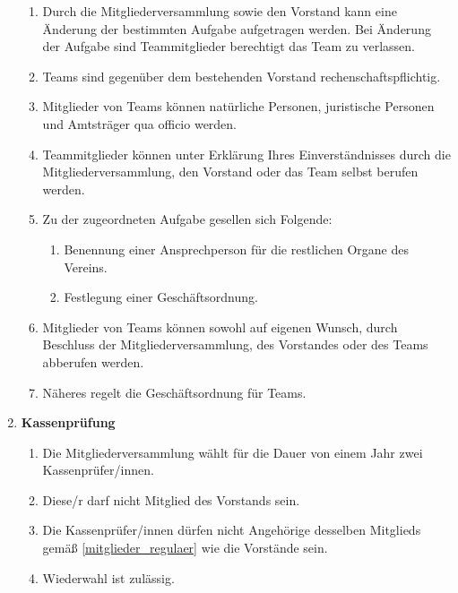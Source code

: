 \documentclass[german]{article}
\newcommand{\paragr}[1]{\item \textsf{\textbf{#1}}}
\begin{document}
\begin{enumerate}
\begin{enumerate}
			\item Durch die Mitgliederversammlung sowie den Vorstand kann eine Änderung der bestimmten Aufgabe aufgetragen werden. Bei Änderung der Aufgabe sind Teammitglieder berechtigt das Team zu verlassen.
			
			\item Teams sind gegenüber dem bestehenden Vorstand rechenschaftspflichtig.
			
			\item Mitglieder von Teams können natürliche Personen, juristische Personen und Amtsträger qua officio werden.
			
			\item Teammitglieder können unter Erklärung Ihres Einverständnisses durch die Mitgliederversammlung, den Vorstand oder das Team selbst berufen werden.
			
			\item Zu der zugeordneten Aufgabe gesellen sich Folgende:
			\begin{enumerate}
				\item Benennung einer Ansprechperson für die restlichen Organe des Vereins.
				\item Festlegung einer Geschäftsordnung.
			\end{enumerate}
			
			\item Mitglieder von Teams können sowohl auf eigenen Wunsch, durch Beschluss der Mitgliederversammlung, des Vorstandes oder des Teams abberufen werden.
			
			\item Näheres regelt die Geschäftsordnung für Teams.
			
		\end{enumerate}
		
		
		\paragr{Kassenprüfung}
		\begin{enumerate}
			
			\item Die Mitgliederversammlung wählt für die Dauer von einem Jahr zwei Kassenprüfer/innen.
			
			\item Diese/r darf nicht Mitglied des Vorstands sein.
			
			\item Die Kassenprüfer/innen dürfen nicht Angehörige desselben Mitglieds gemäß \ref{mitglieder_regulaer} wie die Vorstände sein.
			
			\item Wiederwahl ist zulässig.
			

\end{enumerate}
\end{enumerate}
\end{document}
